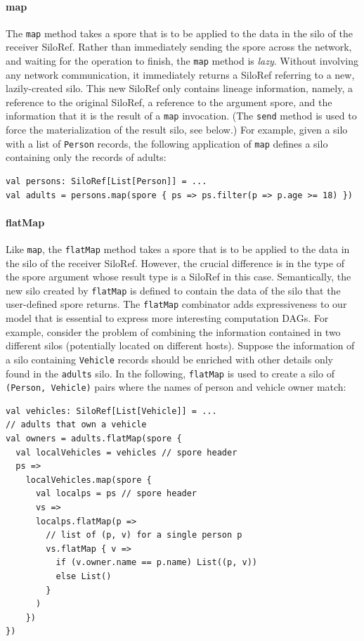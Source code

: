 \documentclass[preprint]{sigplanconf}
\theoremstyle{definition}
\theoremstyle{definition}
\begin{document}
\paragraph{map}
The \verb|map| method takes a spore that is to be applied to the data in the
silo of the receiver SiloRef. Rather than immediately sending the spore across
the network, and waiting for the operation to finish, the \verb|map| method is
\emph{lazy}. Without involving any network communication, it immediately
returns a SiloRef referring to a new, lazily-created silo. This new SiloRef
only contains lineage information, namely, a reference to the original
SiloRef, a reference to the argument spore, and the information that it is the
result of a \verb|map| invocation. (The \verb|send| method is used to force
the materialization of the result silo, see below.) For example, given a silo
with a list of \verb|Person| records, the following application of \verb|map|
defines a silo containing only the records of adults:

\begin{lstlisting}
val persons: SiloRef[List[Person]] = ...
val adults = persons.map(spore { ps => ps.filter(p => p.age >= 18) })
\end{lstlisting}

\paragraph{flatMap}
Like \verb|map|, the \verb|flatMap| method takes a spore that is to be applied
to the data in the silo of the receiver SiloRef. However, the crucial
difference is in the type of the spore argument whose result type is a SiloRef
in this case. Semantically, the new silo created by \verb|flatMap| is defined
to contain the data of the silo that the user-defined spore returns. The
\verb|flatMap| combinator adds expressiveness to our model that is essential
to express more interesting computation DAGs. For example, consider the
problem of combining the information contained in two different silos
(potentially located on different hosts). Suppose the information of a silo
containing \verb|Vehicle| records should be enriched with other details only
found in the \verb|adults| silo. In the following, \verb|flatMap| is used to
create a silo of \verb|(Person, Vehicle)| pairs where the names of person and
vehicle owner match:

\begin{lstlisting}
val vehicles: SiloRef[List[Vehicle]] = ...
// adults that own a vehicle
val owners = adults.flatMap(spore {
  val localVehicles = vehicles // spore header
  ps =>
    localVehicles.map(spore {
      val localps = ps // spore header
      vs =>
      localps.flatMap(p =>
        // list of (p, v) for a single person p
        vs.flatMap { v =>
          if (v.owner.name == p.name) List((p, v))
          else List()
        }
      )
    })
})
\end{lstlisting}
\end{document}

